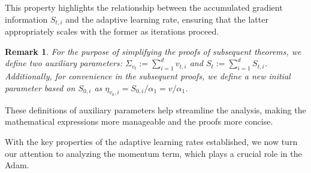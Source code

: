 \documentclass{article} %
\newtheorem{remark}{Remark}[section]
\begin{document}
This property highlights the relationship between the accumulated gradient information \(S_{t,i}\) and the adaptive learning rate, ensuring that the latter appropriately scales with the former as iterations proceed.

\begin{remark}\label{S_t}
For the purpose of simplifying the proofs of subsequent theorems, we define two auxiliary parameters: \(\Sigma_{v_{t}} := \sum_{i=1}^{d}v_{t,i}\) and \(S_{t} := \sum_{i=1}^{d}S_{t,i}\). Additionally, for convenience in the subsequent proofs, we define a new initial parameter based on \(S_{0,i}\) as \(\eta_{v_{0},i} = S_{0,i}/\alpha_{1} = v/\alpha_{1}\).
\end{remark}
These definitions of auxiliary parameters help streamline the analysis, making the mathematical expressions more manageable and the proofs more concise.

With the key properties of the adaptive learning rates established, we now turn our attention to analyzing the momentum term, which plays a crucial role in the Adam.
\end{document}
